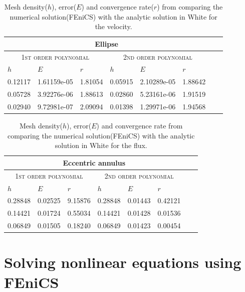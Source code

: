 \documentclass[11pt,a4paper,english]{article}
\numberwithin{equation}{section}
\begin{document}
\begin{table}[H]
\centering
\caption{Mesh density($h$), error($E$) and convergence rate($r$) from comparing the numerical solution(FEniCS) with the analytic solution in White for the velocity. }
\vspace{3mm}
\begin{tabular}{|l|l|l|l|l|l|l|l|}
\hline
 \multicolumn{6}{|c|}{\textbf{Ellipse}}   \\
\hline
 \multicolumn{3}{|c|}{ \textsc{1st order polynomial}} &  \multicolumn{3}{|c|}{\textsc{2nd order polynomial}}  \\
\hline
$h$ & $E$ & $r$ & $h$ & $E$ & $r$   \\
\hline
0.12117 & 1.61159e-05 & 1.81054 & 0.05915 & 2.10289e-05 & 1.88642 \\
0.05728 & 3.92276e-06 & 1.88613 & 0.02860 & 5.23161e-06 & 1.91519 \\
0.02940 & 9.72981e-07 & 2.09094 & 0.01398 & 1.29971e-06 & 1.94568 \\
\hline
\end{tabular}
\label{tab:time}
\end{table}


\begin{table}[H]
\centering
\caption{Mesh density($h$), error($E$) and convergence rate from comparing the numerical solution(FEniCS) with the analytic solution in White for the flux. }
\vspace{3mm}
\begin{tabular}{|l|l|l|l|l|l|l|l|}
\hline
 \multicolumn{6}{|c|}{\textbf{Eccentric annulus}}   \\
\hline
 \multicolumn{3}{|c|}{ \textsc{1st order polynomial}} &  \multicolumn{3}{|c|}{\textsc{2nd order polynomial}}  \\
\hline
$h$ & $E$ & $r$ & $h$ & $E$ & $r$   \\
\hline
0.28848 & 0.02525 & 9.15876 & 0.28848 & 0.01443 & 0.42121 \\
0.14421 & 0.01724 & 0.55034 & 0.14421 & 0.01428 & 0.01536 \\
0.06849 & 0.01505 & 0.18240 & 0.06849 & 0.01423 & 0.00454 \\
\hline
\end{tabular}
\label{tab:time}
\end{table}


\section{Solving nonlinear equations using FEniCS}
\end{document}
